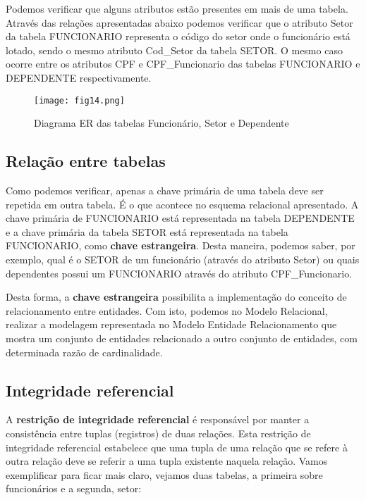 \documentclass{article}
\begin{document}
Podemos verificar que alguns atributos estão presentes em mais de uma tabela. Através das relações apresentadas abaixo podemos verificar que o atributo Setor da tabela FUNCIONARIO representa o código do setor onde o funcionário está lotado, sendo o mesmo atributo Cod\_Setor da tabela SETOR. O mesmo caso ocorre entre os atributos CPF e CPF\_Funcionario das tabelas FUNCIONARIO e DEPENDENTE respectivamente.
\begin{figure}[H]
    \centering
    \texttt{[image: fig14.png]}
    \caption{Diagrama ER das tabelas Funcionário, Setor e Dependente}
    \label{fig:fig14}
\end{figure}

\subsection*{Relação entre tabelas}
Como podemos verificar, apenas a chave primária de uma tabela deve ser repetida em outra tabela. É o que acontece no esquema relacional apresentado. A chave primária de FUNCIONARIO está representada na tabela DEPENDENTE e a chave primária da tabela SETOR está representada na tabela FUNCIONARIO, como \textbf{chave estrangeira}. Desta maneira, podemos saber, por exemplo, qual é o SETOR de um funcionário (através do atributo Setor) ou quais dependentes possui um FUNCIONARIO através do atributo CPF\_Funcionario.

Desta forma, a \textbf{chave estrangeira} possibilita a implementação do conceito de relacionamento entre entidades. Com isto, podemos no Modelo Relacional, realizar a modelagem representada no Modelo Entidade Relacionamento que mostra um conjunto de entidades relacionado a outro conjunto de entidades, com determinada razão de cardinalidade.

\subsection{Integridade referencial}
A \textbf{restrição de integridade referencial} é responsável por manter a consistência entre tuplas (registros) de duas relações. Esta restrição de integridade referencial estabelece que uma tupla de uma relação que se refere à outra relação deve se referir a uma tupla existente naquela relação. Vamos exemplificar para ficar mais claro, vejamos duas tabelas, a primeira sobre funcionários e a segunda, setor:
\end{document}
